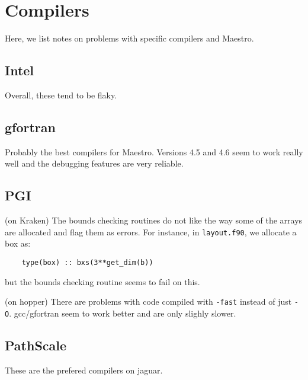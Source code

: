 \section{Compilers}

Here, we list notes on problems with specific compilers and Maestro.

\subsection{Intel}

Overall, these tend to be flaky. 

\subsection{gfortran}

Probably the best compilers for Maestro.  Versions 4.5 and 4.6 seem to work
really well and the debugging features are very reliable.


\subsection{PGI}

(on Kraken) The bounds checking routines do not like the way some of
the arrays are allocated and flag them as errors.  For instance, in
{\tt layout.f90}, we allocate a box as:
\begin{verbatim}
    type(box) :: bxs(3**get_dim(b))
\end{verbatim}
but the bounds checking routine seems to fail on this.

(on hopper) There are problems with code compiled with {\tt -fast}
instead of just {\tt -O}.  gcc/gfortran seem to work better and 
are only slighly slower.


\subsection{PathScale}

These are the prefered compilers on jaguar.

